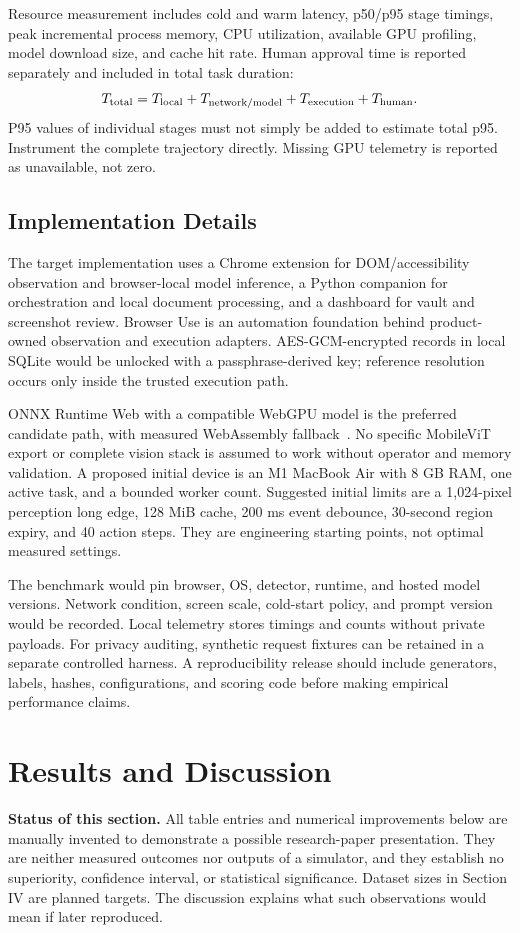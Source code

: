 \documentclass[conference]{IEEEtran}
\begin{document}
Resource measurement includes cold and warm latency, p50/p95 stage timings, peak incremental process memory, CPU utilization, available GPU profiling, model download size, and cache hit rate. Human approval time is reported separately and included in total task duration:
\begin{equation}
 T_{\rm total}=T_{\rm local}+T_{\rm network/model}+T_{\rm execution}+T_{\rm human}.
\end{equation}
P95 values of individual stages must not simply be added to estimate total p95. Instrument the complete trajectory directly. Missing GPU telemetry is reported as unavailable, not zero.

\subsection{Implementation Details}
The target implementation uses a Chrome extension for DOM/accessibility observation and browser-local model inference, a Python companion for orchestration and local document processing, and a dashboard for vault and screenshot review. Browser Use is an automation foundation behind product-owned observation and execution adapters. AES-GCM-encrypted records in local SQLite would be unlocked with a passphrase-derived key; reference resolution occurs only inside the trusted execution path.

ONNX Runtime Web with a compatible WebGPU model is the preferred candidate path, with measured WebAssembly fallback~\cite{ort}. No specific MobileViT export or complete vision stack is assumed to work without operator and memory validation. A proposed initial device is an M1 MacBook Air with 8 GB RAM, one active task, and a bounded worker count. Suggested initial limits are a 1,024-pixel perception long edge, 128 MiB cache, 200 ms event debounce, 30-second region expiry, and 40 action steps. They are engineering starting points, not optimal measured settings.

The benchmark would pin browser, OS, detector, runtime, and hosted model versions. Network condition, screen scale, cold-start policy, and prompt version would be recorded. Local telemetry stores timings and counts without private payloads. For privacy auditing, synthetic request fixtures can be retained in a separate controlled harness. A reproducibility release should include generators, labels, hashes, configurations, and scoring code before making empirical performance claims.

\section{Results and Discussion}
\textbf{Status of this section.} All table entries and numerical improvements below are manually invented to demonstrate a possible research-paper presentation. They are neither measured outcomes nor outputs of a simulator, and they establish no superiority, confidence interval, or statistical significance. Dataset sizes in Section IV are planned targets. The discussion explains what such observations would mean if later reproduced.
\end{document}
